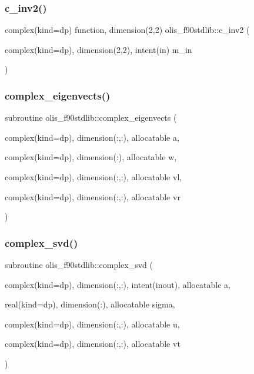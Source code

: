 \mbox{\label{namespaceolis__f90stdlib_a162dd5131a39a62d7b95e2ebca4664a4}} 
\subsubsection{\texorpdfstring{c\+\_\+inv2()}{c\_inv2()}}
{\footnotesize\ttfamily complex(kind=dp) function, dimension(2,2) olis\+\_\+f90stdlib\+::c\+\_\+inv2 (\begin{DoxyParamCaption}\item[{complex(kind=dp), dimension(2,2), intent(in)}]{m\+\_\+in }\end{DoxyParamCaption})}

\mbox{\label{namespaceolis__f90stdlib_a71c5b363b52932a5c69053149ac8cc25}} 
\subsubsection{\texorpdfstring{complex\+\_\+eigenvects()}{complex\_eigenvects()}}
{\footnotesize\ttfamily subroutine olis\+\_\+f90stdlib\+::complex\+\_\+eigenvects (\begin{DoxyParamCaption}\item[{complex(kind=dp), dimension(\+:,\+:), allocatable}]{a,  }\item[{complex(kind=dp), dimension(\+:), allocatable}]{w,  }\item[{complex(kind=dp), dimension(\+:,\+:), allocatable}]{vl,  }\item[{complex(kind=dp), dimension(\+:,\+:), allocatable}]{vr }\end{DoxyParamCaption})}

\mbox{\label{namespaceolis__f90stdlib_a81e060e6ecfde9524a9732349a818db3}} 
\subsubsection{\texorpdfstring{complex\+\_\+svd()}{complex\_svd()}}
{\footnotesize\ttfamily subroutine olis\+\_\+f90stdlib\+::complex\+\_\+svd (\begin{DoxyParamCaption}\item[{complex(kind=dp), dimension(\+:,\+:), intent(inout), allocatable}]{a,  }\item[{real(kind=dp), dimension(\+:), allocatable}]{sigma,  }\item[{complex(kind=dp), dimension(\+:,\+:), allocatable}]{u,  }\item[{complex(kind=dp), dimension(\+:,\+:), allocatable}]{vt }\end{DoxyParamCaption})}

